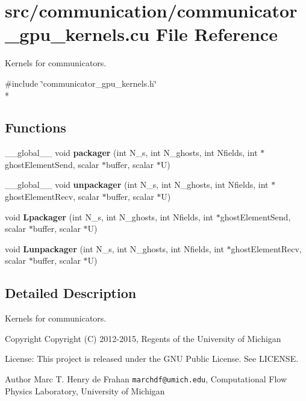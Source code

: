 \section{src/communication/communicator\-\_\-gpu\-\_\-kernels.cu File Reference}
\label{communicator__gpu__kernels_8cu}


Kernels for communicators.  


{\ttfamily \#include \char`\"{}communicator\-\_\-gpu\-\_\-kernels.\-h\char`\"{}}\\*
\subsection*{Functions}
\begin{DoxyCompactItemize}
\item 
\-\_\-\-\_\-global\-\_\-\-\_\- void {\bf packager} (int N\-\_\-s, int N\-\_\-ghosts, int Nfields, int $\ast$ghost\-Element\-Send, scalar $\ast$buffer, scalar $\ast$U)
\item 
\-\_\-\-\_\-global\-\_\-\-\_\- void {\bf unpackager} (int N\-\_\-s, int N\-\_\-ghosts, int Nfields, int $\ast$ghost\-Element\-Recv, scalar $\ast$buffer, scalar $\ast$U)
\item 
void {\bf Lpackager} (int N\-\_\-s, int N\-\_\-ghosts, int Nfields, int $\ast$ghost\-Element\-Send, scalar $\ast$buffer, scalar $\ast$U)
\item 
void {\bf Lunpackager} (int N\-\_\-s, int N\-\_\-ghosts, int Nfields, int $\ast$ghost\-Element\-Recv, scalar $\ast$buffer, scalar $\ast$U)
\end{DoxyCompactItemize}


\subsection{Detailed Description}
Kernels for communicators. \begin{DoxyCopyright}{Copyright}
Copyright (C) 2012-\/2015, Regents of the University of Michigan 
\end{DoxyCopyright}
\begin{DoxyParagraph}{License\-:}
This project is released under the G\-N\-U Public License. See L\-I\-C\-E\-N\-S\-E. 
\end{DoxyParagraph}
\begin{DoxyAuthor}{Author}
Marc T. Henry de Frahan {\tt marchdf@umich.\-edu}, Computational Flow Physics Laboratory, University of Michigan 
\end{DoxyAuthor}
